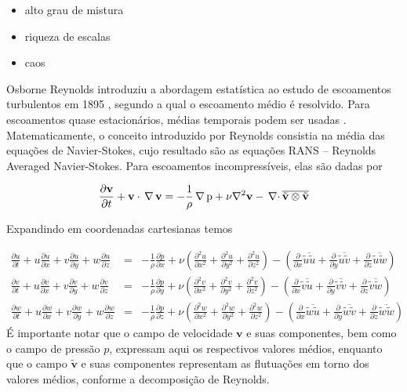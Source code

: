 \documentclass[a4paper,portuguese,10pt]{article}
\renewcommand{\div}{{\,\nabla\cdot}\,}
\newcommand{\grad}{\,\rm \nabla\,}
\renewcommand{\D}{\partial}
\renewcommand{\vec}{\mathbf}
\begin{document}
\begin{itemize}
\item alto grau de mistura
\item riqueza de escalas
\item caos
\end{itemize}

Osborne Reynolds introduziu a abordagem estatística ao estudo de escoamentos turbulentos em 1895 \cite{REYNOLDS95}, segundo a qual o escoamento médio é resolvido. Para escoamentos quase estacionários, médias temporais podem ser usadas \cite{FREIRE02}. Matematicamente, o conceito introduzido por Reynolds consistia na média das equações de Navier-Stokes, cujo resultado são as equações RANS -- Reynolds Averaged Navier-Stokes. Para escoamentos incompressíveis, elas são dadas por

\begin{equation}
  \frac{\D\vec{v}}{\D t}+\vec{v}\cdot\grad\vec{v}=-\frac{1}{\rho}\grad p+\nu\nabla^2\vec{v}-\div\overline{\tilde{\vec{v}}\otimes\tilde{\vec{v}}}
  \label{eq:rans_incompressivel_1}
\end{equation}

Expandindo em coordenadas cartesianas temos

\begin{subequations}
  \begin{eqnarray}
    \frac{\D u}{\D t}+u\frac{\D u}{\D x}+v\frac{\D u}{\D y}+w\frac{\D u}{\D z}&=&-\frac{1}{\rho}\frac{\D p}{\D x}+\nu\left(\frac{\D^2u}{\D x^2}+\frac{\D^2u}{\D y^2}+\frac{\D^2u}{\D z^2}\right)-\left(\frac{\D}{\D x}\overline{\tilde{u}\tilde{u}}+\frac{\D}{\D y}\overline{\tilde{u}\tilde{v}}+\frac{\D}{\D z}\overline{\tilde{u}\tilde{w}}\right)\\
    \frac{\D v}{\D t}+u\frac{\D v}{\D x}+v\frac{\D v}{\D y}+w\frac{\D v}{\D z}&=&-\frac{1}{\rho}\frac{\D p}{\D y}+\nu\left(\frac{\D^2v}{\D x^2}+\frac{\D^2v}{\D y^2}+\frac{\D^2v}{\D z^2}\right)-\left(\frac{\D}{\D x}\overline{\tilde{v}\tilde{u}}+\frac{\D}{\D y}\overline{\tilde{v}\tilde{v}}+\frac{\D}{\D z}\overline{\tilde{v}\tilde{w}}\right)\\
    \frac{\D w}{\D t}+u\frac{\D w}{\D x}+v\frac{\D w}{\D y}+w\frac{\D w}{\D z}&=&-\frac{1}{\rho}\frac{\D p}{\D z}+\nu\left(\frac{\D^2w}{\D x^2}+\frac{\D^2w}{\D y^2}+\frac{\D^2w}{\D z^2}\right)-\left(\frac{\D}{\D x}\overline{\tilde{w}\tilde{u}}+\frac{\D}{\D y}\overline{\tilde{w}\tilde{v}}+\frac{\D}{\D z}\overline{\tilde{w}\tilde{w}}\right)
  \end{eqnarray}
\end{subequations}
É importante notar que o campo de velocidade $\vec{v}$ e suas componentes, bem como o campo de pressão $p$, expressam aqui os respectivos valores médios, enquanto que o campo $\tilde{\vec{v}}$ e suas componentes representam as flutuações em torno dos valores médios, conforme a decomposição de Reynolds.
\end{document}
